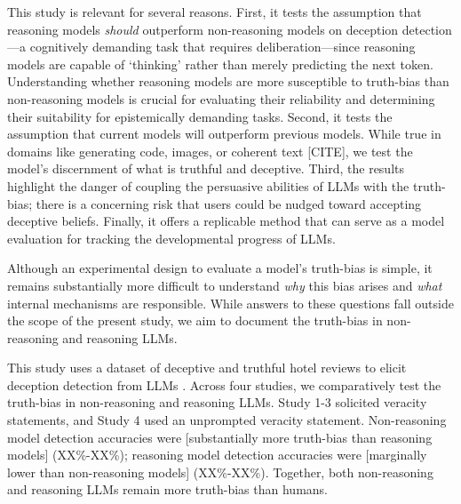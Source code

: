 \documentclass{article}
\begin{document}
This study is relevant for several reasons. First, it tests the assumption that reasoning models \textit{should} outperform non-reasoning models on deception detection---a cognitively demanding task that requires deliberation---since reasoning models are capable of `thinking' rather than merely predicting the next token. Understanding whether reasoning models are more susceptible to truth-bias than non-reasoning models is crucial for evaluating their reliability and determining their suitability for epistemically demanding tasks. Second, it tests the assumption that current models will outperform previous models. While true in domains like generating code, images, or coherent text [CITE], we test the model's discernment of what is truthful and deceptive. Third, the results highlight the danger of coupling the persuasive abilities of LLMs with the truth-bias; there is a concerning risk that users could be nudged toward accepting deceptive beliefs. Finally, it offers a replicable method that can serve as a model evaluation for tracking the developmental progress of LLMs.



Although an experimental design to evaluate a model's truth-bias is simple, it remains substantially more difficult to understand \textit{why} this bias arises and \textit{what} internal mechanisms are responsible. While answers to these questions fall outside the scope of the present study, we aim to document the truth-bias in non-reasoning and reasoning LLMs.

This study uses a dataset of deceptive and truthful hotel reviews \citep{ott_finding_2011} to elicit deception detection from LLMs \citep{markowitz_generative_2024}. Across four studies, we comparatively test the truth-bias in non-reasoning and reasoning LLMs. Study 1-3 solicited veracity statements, and Study 4 used an unprompted veracity statement. Non-reasoning model detection accuracies were [substantially more truth-bias than reasoning models] (XX\%-XX\%); reasoning model detection accuracies were [marginally lower than non-reasoning models] (XX\%-XX\%). Together, both non-reasoning and reasoning LLMs remain more truth-bias than humans.
\end{document}
